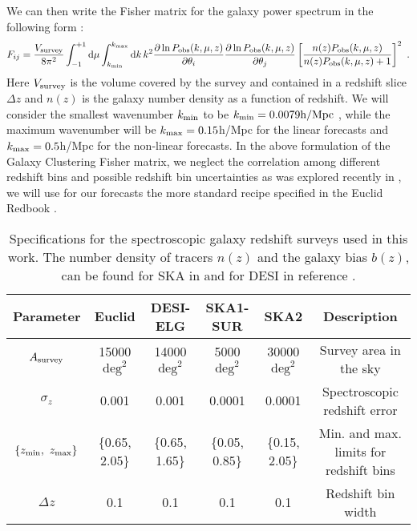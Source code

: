 We can then write the
Fisher matrix for the galaxy power spectrum in the following
form \citep{seo_improved_2007, amendola_testing_2012}: 
\begin{equation}
F_{ij}=\frac{V_{\rm survey}}{8\pi^{2}}\int_{-1}^{+1}\mbox{d}\mu\int_{k_{\rm min}}^{k_{\rm max}}\mbox{d}k\,k^{2}\frac{\partial\ln
P_{\mathrm{obs}} (k,\mu,z)}{\partial\theta_{i}}\frac{\partial\ln
P_{\mathrm{obs}} (k,\mu,z)}{\partial\theta_{j}}\left[\frac{n(z)P_{\mathrm{obs}} (k,\mu,z)}{n(z)P_{\mathrm{obs}} (k,\mu,z)+1}\right]^{2}\,\,.\label{eq:fisher-matrix-gc}
\end{equation}
Here $V_{\rm survey}$
is the volume covered by the survey and contained in a redshift slice
$\Delta z$ and $n(z)$ is the galaxy number density as a function of
redshift.
We will consider the smallest wavenumber $k_{\rm min}$ to be $k_{\rm min}=0.0079\textrm{h/Mpc}$ , while the maximum wavenumber will be 
$k_{\rm max}=0.15$h/Mpc for the linear forecasts and $k_{\rm max}=0.5$h/Mpc for the non-linear forecasts.
In the above formulation of the Galaxy Clustering Fisher matrix, we neglect the correlation among different redshift bins and possible
redshift bin uncertainties as was explored recently in \cite{bailoni_improving_2016}, we will use for our forecasts the 
more standard recipe specified in the Euclid Redbook \cite{laureijs_euclid_2011}. 


\begin{table}[h]
\centering{}
\begin{tabular}{|c|cccc|c|}
\hline 
\Tstrut \textbf{Parameter}  & \textbf{Euclid}  & \textbf{DESI-ELG}  & \textbf{SKA1-SUR}
& \textbf{SKA2}  & \textbf{Description}\tabularnewline
\hline 
\Tstrut $A_{\rm survey}$  & 15000 $\mbox{deg}^{2}$  & 14000 $\mbox{deg}^{2}$  & 5000
$\mbox{deg}^{2}$  & 30000 $\mbox{deg}^{2}$  & Survey area in the
sky\tabularnewline
$\sigma_{z}$  & 0.001  & 0.001  & 0.0001  & 0.0001  & Spectroscopic redshift
error\tabularnewline
$\{z_{\rm min},\ z_{\rm max}\}$  & \{0.65, 2.05\}  & \{0.65, 1.65\}  & \{0.05, 0.85\}
& \{0.15, 2.05\}  & Min. and max. limits for redshift bins \tabularnewline
$\Delta z$  & 0.1  & 0.1  & 0.1  & 0.1  & Redshift bin width\tabularnewline
\hline 
\end{tabular}\caption[Specifications for future GC surveys.]{\label{tab:GC-specifications} Specifications for
the spectroscopic
galaxy redshift surveys used in this work. The number density of tracers $n(z)$ and the galaxy bias $b(z)$, can be found for SKA in \cite{santos_hi_2015} and for DESI in reference \cite{desi_collaboration_desi_2016-1}.}
\end{table}


